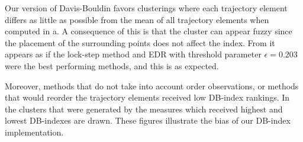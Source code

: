 Our version of Davis-Bouldin favors clusterings where each trajectory element differs as little as possible from the mean of all trajectory elements when computed in a. A consequence of this is that the cluster can appear fuzzy since the placement of the surrounding points does not affect the index. 
From  it appears as if the lock-step method and EDR with threshold parameter $\epsilon=0.203$ were the best performing methods, and this is as expected. 

Moreover, methods that do not take into account order observations, or methods that would reorder the trajectory elements received low DB-index rankings. In   the clusters that were generated by the measures which received highest and lowest DB-indexes are drawn. These figures illustrate the bias of our DB-index implementation. 


